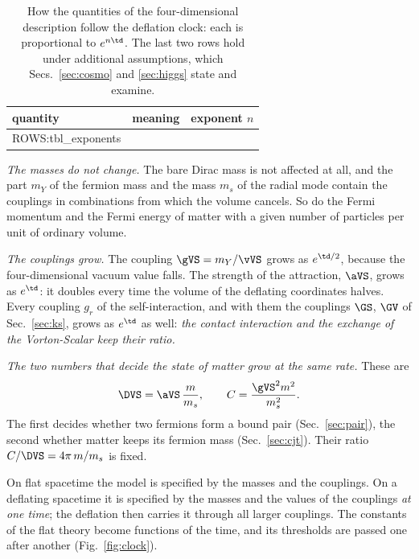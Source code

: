 \begin{table}
\caption{\label{tab:exponents}How the quantities of the four-dimensional description follow the
deflation clock: each is proportional to $e^{n\td}$. The last two rows hold under additional
assumptions, which Secs.~\ref{sec:cosmo} and \ref{sec:higgs} state and examine.}
\begin{ruledtabular}
\begin{tabular}{p{}p{}c}
quantity & meaning & exponent $n$ \\
\hline
{{ROWS:tbl_exponents}}
\end{tabular}
\end{ruledtabular}
\end{table}

\emph{The masses do not change.} The bare Dirac mass is not affected at all, and the part $m_Y$ of
the fermion mass and the mass $m_s$ of the radial mode contain the couplings in combinations from
which the volume cancels. So do the Fermi momentum and the Fermi
energy of matter with a given number of particles per unit of ordinary volume.

\emph{The couplings grow.} The coupling $\gVS=m_Y/\vVS$ grows as $e^{\td/2}$, because the
four-dimensional vacuum value falls. The strength of the attraction, $\aVS$, grows as $e^{\td}$: it
doubles every time the volume of the deflating coordinates halves. Every coupling $g_r$ of the
self-interaction, and with them the couplings $\GS$, $\GV$ of Sec.~\ref{sec:ks}, grows as $e^{\td}$
as well: \emph{the contact interaction and the exchange of the Vorton-Scalar keep their ratio.}

\emph{The two numbers that decide the state of matter grow at the same rate.} These are
\begin{equation}
\DVS=\aVS\,\frac{m}{m_s},\qquad C=\frac{\gVS^{2}m^{2}}{m_s^{2}} .
\label{eq:DC}
\end{equation}
The first decides whether two fermions form a bound pair (Sec.~\ref{sec:pair}), the second whether
matter keeps its fermion mass (Sec.~\ref{sec:cjt}). Their ratio $C/\DVS=4\pi\,m/m_s$ is fixed.

On flat spacetime the model is specified by the masses and the couplings. On a deflating spacetime
it is specified by the masses and the values of the couplings \emph{at one time}; the deflation then
carries it through all larger couplings. The constants of the flat theory become functions of the
time, and its thresholds are passed one after another (Fig.~\ref{fig:clock}).

